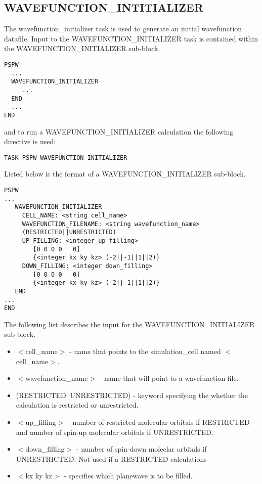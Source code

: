 \subsection{WAVEFUNCTION\_INTITIALIZER}
The wavefunction\_initializer task is used to generate an initial wavefunction
datafile.
Input to the WAVEFUNCTION\_INITIALIZER task is contained
within the WAVEFUNCTION\_INITIALIZER sub-block.
\begin{verbatim}
PSPW
  ...
  WAVEFUNCTION_INITIALIZER
     ...
  END
  ...
END
\end{verbatim}
and to run a WAVEFUNCTION\_INITIALIZER calculation the following directive 
is used:
\begin{verbatim}
TASK PSPW WAVEFUNCTION_INITIALIZER
\end{verbatim}
Listed below is the format of a WAVEFUNCTION\_INITIALIZER sub-block.
\begin{verbatim}
PSPW
... 
   WAVEFUNCTION_INITIALIZER
     CELL_NAME: <string cell_name>
     WAVEFUNCTION_FILENAME: <string wavefunction_name>
     (RESTRICTED||UNRESTRICTED)
     UP_FILLING: <integer up_filling>
        [0 0 0 0   0]
        {<integer kx ky kz> (-2||-1||1||2)}
     DOWN_FILLING: <integer down_filling>
        [0 0 0 0   0]
        {<integer kx ky kz> (-2||-1||1||2)}
   END
...
END
\end{verbatim}
The following list describes the input for the WAVEFUNCTION\_INITIALIZER
sub-block.
\begin{itemize}
	\item $<$cell\_name$>$ - name that points 
		to the simulation\_cell named $<$cell\_name$>$.
	\item $<$wavefunction\_name$>$ - name that will point
              to a wavefunction file.
	\item (RESTRICTED$||$UNRESTRICTED) - keyword specifying the whether
              the calculation is restricted or unrestricted.
	\item $<$up\_filling$>$ - number of restricted molecular orbitals if
              RESTRICTED and number of spin-up molecular orbitals if 
              UNRESTRICTED.
        \item $<$down\_filling$>$ - number of spin-down moleclar orbitals if
              UNRESTRICTED.  Not used if a RESTRICTED calculations
        \item $<$kx ky kz$>$ - specifies which planewave is to be filled. 
\end{itemize}




